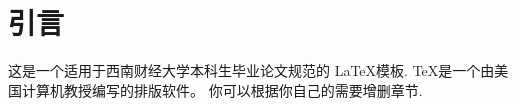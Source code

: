 \section{引言}
这是一个适用于西南财经大学本科生毕业论文规范的 \LaTeX \cite{lamport1994latex,goossens1994latex}模板.
\TeX 是一个由美国计算机教授\citet{knuth1984texbook}编写的排版软件。
你可以根据你自己的需要增删章节.